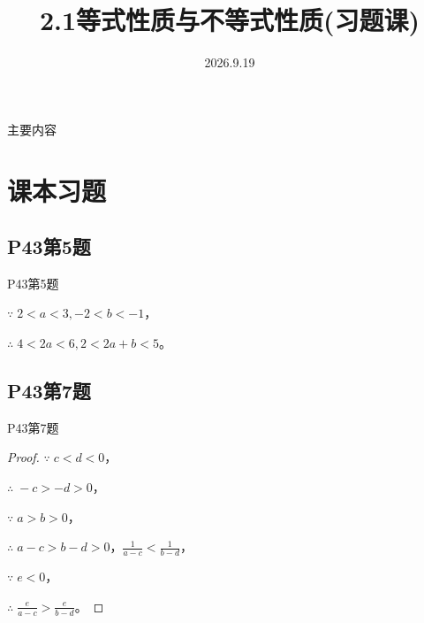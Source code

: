 \documentclass[12pt,aspectratio=169,t,fleqn]{beamer}
\title[2.1等式性质与不等式性质(习题课)] %
{2.1等式性质与不等式性质(习题课)}
\subtitle
{}
\author[好好学习，努力向上] %
{
	}
\institute[夏邑一高] %
{
 }
\date[2026.9.19] %
{2026.9.19}
\begin{document}
\begin{frame}
  \titlepage
\end{frame}

\begin{frame}{主要内容}
  \tableofcontents
\end{frame}


\section{课本习题}

\subsection{P43第5题}

\begin{frame}{P43第5题}

  \begin{solution}
  	$\because\;2<a<3,-2<b<-1$， 
  	
  	$\therefore\;4<2a<6,2<2a+b<5$。
  \end{solution}
  
\end{frame}


\subsection{P43第7题}

\begin{frame}{P43第7题}

  \begin{proof}
  	$\because\;c<d<0$，
  	
  	$\therefore\;-c>-d>0$，
  	
  	$\because\;a>b>0$，
  	
  	$\therefore\;a-c>b-d>0$，$\frac{1}{a-c}<\frac{1}{b-d}$，
  	
  	$\because\;e<0$，
  	
  	$\therefore\;\frac{e}{a-c}>\frac{e}{b-d}$。
  \end{proof}
\end{frame}
\end{document}
